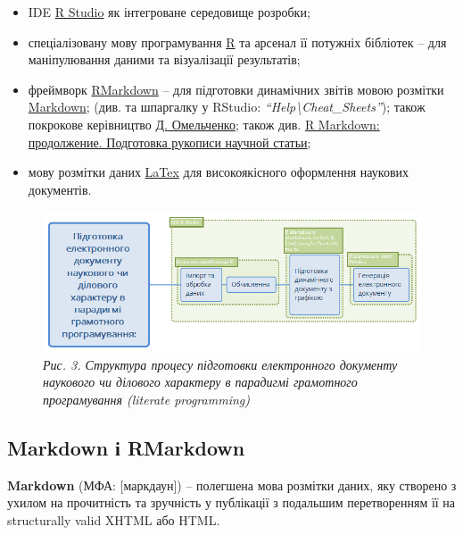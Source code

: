 \documentclass[
]{book}
\begin{document}
\begin{itemize}
\item
  IDE \href{https://www.rstudio.com/}{R Studio} \citep{R-Studio} як інтегроване середовище розробки;
\item
  спеціалізовану мову програмування \href{https://cran.r-project.org/}{R} \citep{R-base} та арсенал її потужніх бібліотек -- для маніпулювання даними та візуалізації результатів;
\item
  фреймворк \href{http://rmarkdown.rstudio.com/}{RMarkdown} \citep{R-rmarkdown} -- для підготовки динамічних звітів мовою розмітки \href{https://uk.wikipedia.org/wiki/Markdown}{Markdown}; (див.\citep{CheatSheetMarkdown} та шпаргалку у RStudio: \emph{``Help\textbackslash Cheat\_Sheets''}); також покрокове керівництво \href{https://rpubs.com/domelia/828777}{Д. Омельченко}; також див. \href{https://rpubs.com/domelia/834925}{R Markdown: продолжение. Подготовка рукописи научной статьи};
\item
  мову розмітки даних \href{https://uk.wikipedia.org/wiki/LaTeX}{LaTex} для високоякісного оформлення наукових документів.
\end{itemize}

\begin{figure}
\centering
\includegraphics{image/process.png}
\caption{\emph{Рис. 3. Структура процесу підготовки електронного документу наукового чи ділового характеру в парадигмі грамотного програмування (literate programming)}}
\end{figure}

\hypertarget{markdown-ux456-rmarkdown}{%
\subsection{Markdown і RMarkdown}\label{markdown-ux456-rmarkdown}}

\textbf{Markdown} (МФА: {[}маркдаун{]}) -- полегшена мова розмітки даних, яку створено з ухилом на прочитність та зручність у публікації з подальшим перетворенням її на structurally valid XHTML або HTML.
\end{document}
